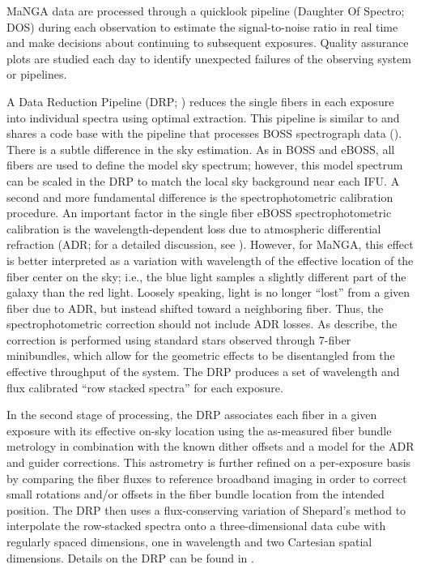 MaNGA data are processed through a quicklook pipeline (Daughter Of
Spectro; DOS) during each observation to estimate the signal-to-noise
ratio in real time and make decisions about continuing to subsequent
exposures. Quality assurance plots are studied each day to identify
unexpected failures of the observing system or pipelines.

A Data Reduction Pipeline (DRP; \citealt{law16a}) reduces the single
fibers in each exposure into individual spectra using optimal
extraction. This pipeline is similar to and shares a code base
with the pipeline that processes BOSS spectrograph data
(\citealt{bolton12a}).  There is a subtle difference in the sky
estimation. As in BOSS and eBOSS, all fibers are used to define the
model sky spectrum; however, this model spectrum can be scaled in the DRP to
match the local sky background near each IFU.  A second and more
fundamental difference is the spectrophotometric calibration
procedure.  An important factor in the single fiber eBOSS
spectrophotometric calibration is the wavelength-dependent loss due to
atmospheric differential refraction (ADR; for a detailed discussion,
see \citealt{margala16a}).  However, for MaNGA, this effect is better
interpreted as a variation with wavelength of the effective location
of the fiber center on the sky; i.e., the blue light samples a slightly
different part of the galaxy than the red light. Loosely speaking,
light is no longer ``lost'' from a given fiber due to ADR, but instead
shifted toward a neighboring fiber.  Thus, the spectrophotometric
correction should not include ADR losses. As \citet{yan16a} describe,
the correction is performed using standard stars observed through 7-fiber
minibundles, which allow for the geometric effects to be disentangled
from the effective throughput of the system. 
The DRP produces a set of wavelength and flux calibrated ``row
stacked spectra'' for each exposure.

In the second stage of processing, the DRP associates each fiber in a
given exposure with its effective on-sky location using the
as-measured fiber bundle metrology in combination with the known
dither offsets and a model for the ADR and guider corrections.  This
astrometry is further refined on a per-exposure basis by comparing the
fiber fluxes to reference broadband imaging in order to correct small
rotations and/or offsets in the fiber bundle location from the
intended position.  The DRP then uses a flux-conserving variation of
Shepard's method \citep{sanchez12} to interpolate the row-stacked spectra onto a
three-dimensional data cube with regularly spaced dimensions, one in
wavelength and two Cartesian spatial dimensions.  Details on the DRP
can be found in \citet{law16a}.

